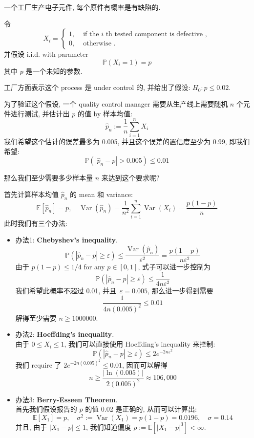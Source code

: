 \begin{example}
一个工厂生产电子元件, 
每个原件有概率是有缺陷的. 

令 
$$
X_i= \begin{cases}1, & \text { if the } i \text { th tested component is defective }, \\ 0, & \text { otherwise } .\end{cases}
$$
并假设 i.i.d. with parameter
$$ 
\mathbb{P}(X_i = 1) = p
 $$
 其中 $p$ 是一个未知的参数.

工厂方面表示这个 process 是 under control 的,
并给出了假设: 
$H_0: p \leq 0.02$.

为了验证这个假设, 
一个 quality control manager 
需要从生产线上需要随机 $n$ 个元件进行测试, 
并估计出 $p$ 的值 by 样本均值:
$$
\hat{p}_n:=\frac{1}{n} \sum_{i=1}^n X_i
$$
我们希望这个估计的误差最多为 0.005,
并且这个误差的置信度至少为 0.99, 
即我们希望:
$$ 
\mathbb{P}\left(\left|\hat{p}_n-p\right|>0.005\right) \leq 0.01 
$$

那么我们至少需要多少样本量 $n$ 来达到这个要求呢?


\begin{solution}
首先计算样本均值 $\hat{p}_n$ 的 mean 和 variance: 
$$ 
\mathbb{E}\left[\hat{p}_n\right]=p, \quad \operatorname{Var}\left(\hat{p}_n\right)=\frac{1}{n^2} \sum_{i=1}^n \operatorname{Var}\left(X_i\right)=\frac{p(1-p)}{n} 
$$
此时我们有三个办法:
\begin{itemize}
\item 
办法1: \textbf{Chebyshev's inequality}.
$$ 
\mathbb{P}\left(\left|\hat{p}_n-p\right| \geq \varepsilon\right) \leq \frac{\operatorname{Var}\left(\hat{p}_n\right)}{\varepsilon^2}=\frac{p(1-p)}{n \varepsilon^2} 
$$
由于 $p(1-p) \leq 1/4$ for any $p \in [0,1]$,
式子可以进一步控制为
$$ 
\mathbb{P}\left(\left|\hat{p}_n-p\right| \geq \varepsilon\right) \leq \frac{1}{4 n \varepsilon^2} 
$$
我们希望此概率不超过 0.01,
并且\ $\varepsilon = 0.005$, 那么进一步得到需要
$$ 
\frac{1}{4 n(0.005)^2} \leq 0.01 
$$
解得至少需要 $n\geq 1000000$.

\item 
办法2: \textbf{Hoeffding's inequality}.\\
由于 $0\leq X_i \leq 1$, 
我们可以直接使用 Hoeffding's inequality 来控制: 
$$ \mathbb{P}\left(\left|\hat{p}_n-p\right| \geq \varepsilon\right) \leq 2 e^{-2 n \varepsilon^2}
 $$
我们 require 了 $2 e^{-2 n(0.005)^2} \leq 0.01$, 
因而可以解得
$$ n \geq \frac{|\ln (0.005)|}{2(0.005)^2} \approx 106,000 $$

\item 
办法3: \textbf{Berry-Esseen Theorem}.\\
首先我们假设报告的 $p$ 的值 0.02 是正确的,
从而可以计算出:
$$
\mathbb{E}\left[X_1\right]=p, \quad \sigma^2:=\operatorname{Var}\left(X_1\right)=p(1-p)=0.0196, \quad \sigma=0.14
$$
并且, 由于 $\left|X_1-p\right| \leq 1$, 
我们知道偏度 $\rho:=\mathbb{E}\left[\left|X_1-p\right|^3\right]<\infty$.


\end{itemize}
\end{solution}
\end{example}
